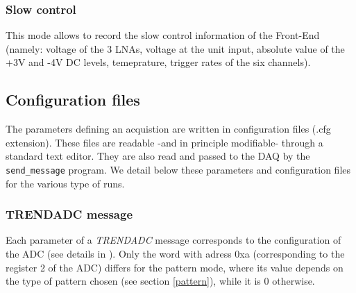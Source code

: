 \subsubsection{Slow control}
This mode allows to record the slow control information of the Front-End (namely: voltage of the 3 LNAs, voltage at the unit input, absolute value of the +3V and -4V DC levels, temeprature, trigger rates of the six channels). 

\subsection{Configuration files}
\label{config}
The parameters defining an acquistion are written in configuration files (.cfg extension). These files are readable -and in principle modifiable- through a standard text editor. They are also read and passed to the DAQ by the \texttt{send\_message} program.
We detail below these parameters and configuration files for the various type of runs. 
%
\subsubsection{TRENDADC message}
Each parameter of a {\it TRENDADC} message corresponds to the configuration of the ADC (see details in \cite{ADCdoc}). Only the word with adress 0xa (corresponding to the register 2 of the ADC) differs for the pattern mode, where its value depends on the type of pattern chosen (see section \ref{pattern}), while it is 0 otherwise. 
%
